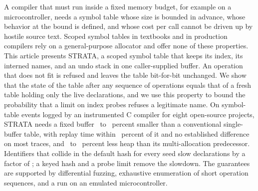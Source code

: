 A compiler that must run inside a fixed memory budget, for example on a microcontroller, needs a symbol table whose size is bounded in advance, whose behavior at the bound is defined, and whose cost per call cannot be driven up by hostile source text. Scoped symbol tables in textbooks and in production compilers rely on a general-purpose allocator and offer none of these properties. This article presents STRATA, a scoped symbol table that keeps its index, its interned names, and an undo stack in one caller-supplied buffer. An operation that does not fit is refused and leaves the table bit-for-bit unchanged. We show that the state of the table after any sequence of operations equals that of a fresh table holding only the live declarations, and we use this property to bound the probability that a limit on index probes refuses a legitimate name. On symbol-table events logged by an instrumented C compiler for eight open-source projects, STRATA needs a fixed buffer \SaveLo\ to \SaveHi\ percent smaller than a conventional single-buffer table, with replay time within \ArenaAbsMax\ percent of it and no established difference on most traces, and \HeapMetisLo\ to \HeapMetisHi\ percent less heap than its multi-allocation predecessor. Identifiers that collide in the default hash for every seed slow declarations by a factor of \FloodRatio; a keyed hash and a probe limit remove the slowdown. The guarantees are supported by differential fuzzing, exhaustive enumeration of short operation sequences, and a run on an emulated microcontroller.
